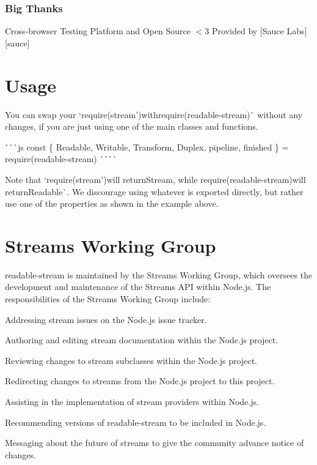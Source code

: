 \subsubsection*{Big Thanks}

Cross-\/browser Testing Platform and Open Source $<$3 Provided by \mbox{[}Sauce Labs\mbox{]}\mbox{[}sauce\mbox{]}

\section*{Usage}

You can swap your `require(\textquotesingle{}stream'){\ttfamily with}require(\textquotesingle{}readable-\/stream\textquotesingle{})\`{} without any changes, if you are just using one of the main classes and functions.

\`{}\`{}\`{}js const \{ Readable, Writable, Transform, Duplex, pipeline, finished \} = require(\textquotesingle{}readable-\/stream\textquotesingle{}) \`{}\`{}\`{}\`{}

Note that `require(\textquotesingle{}stream'){\ttfamily will return}Stream{\ttfamily , while }require(\textquotesingle{}readable-\/stream\textquotesingle{}){\ttfamily will return}Readable\`{}. We discourage using whatever is exported directly, but rather use one of the properties as shown in the example above.

\section*{Streams Working Group}

{\ttfamily readable-\/stream} is maintained by the Streams Working Group, which oversees the development and maintenance of the Streams A\+PI within Node.\+js. The responsibilities of the Streams Working Group include\+:


\begin{DoxyItemize}
\item Addressing stream issues on the Node.\+js issue tracker.
\item Authoring and editing stream documentation within the Node.\+js project.
\item Reviewing changes to stream subclasses within the Node.\+js project.
\item Redirecting changes to streams from the Node.\+js project to this project.
\item Assisting in the implementation of stream providers within Node.\+js.
\item Recommending versions of {\ttfamily readable-\/stream} to be included in Node.\+js.
\item Messaging about the future of streams to give the community advance notice of changes.
\end{DoxyItemize}

